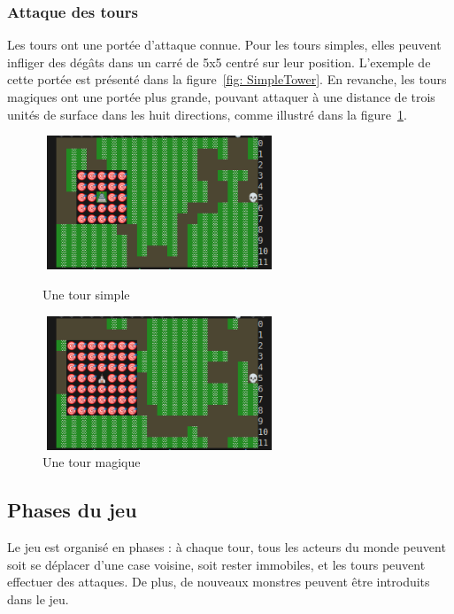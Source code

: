 \documentclass[11pt]{article}
\begin{document}
            \subsubsection{Attaque des tours}
                Les tours ont une portée d'attaque connue. Pour les tours simples, elles peuvent infliger des dégâts dans un carré de 5x5 centré sur leur position. L'exemple de cette portée est présenté dans la figure~\ref{fig: SimpleTower}. En revanche, les tours magiques ont une portée plus grande, pouvant attaquer à une distance de trois unités de surface dans les huit directions, comme illustré dans la figure~\ref{fig: MagicTower }.
                  \begin{figure}[h]
                \begin{minipage}[c]{.46\linewidth}
                    \centering
                    \includegraphics[height=4cm, width = 7cm]{SimpleTowerAttackRange.png}
                    \caption{Une tour simple}
                    \label{fig: SimpleTower}
                \end{minipage}
                \hfill%
                \begin{minipage}[c]{.46\linewidth}
                      \includegraphics[height=4cm, width = 7cm]{MagicTowerAttackRange.png}
                        \caption{Une tour magique} 
                        \label{fig: MagicTower } 
                \end{minipage}
            \end{figure}
        \subsection{Phases du jeu}\label{phases du jeu}
            Le jeu est organisé en phases : à chaque tour, tous les acteurs du monde peuvent soit se déplacer d'une case voisine, soit rester immobiles, et les tours peuvent effectuer des attaques. De plus, de nouveaux monstres peuvent être introduits dans le jeu. 
            
\end{document}
